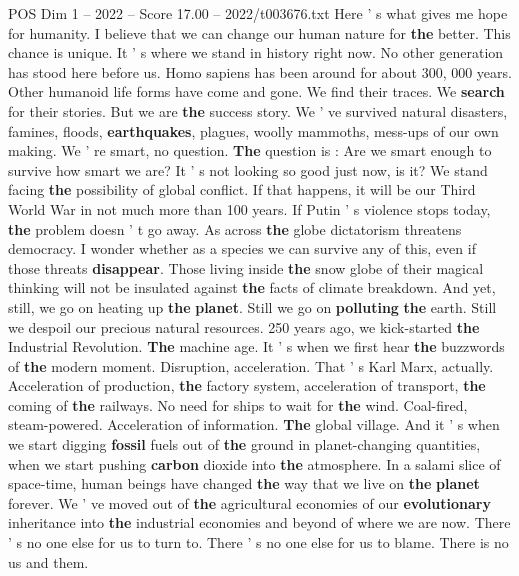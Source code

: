 \begin{textsample}{POS Dim 1 – 2022 – Score 17.00 – 2022/t003676.txt}  \label{ex:f1_pos_070}
Here ' s what gives me hope for humanity.
I believe that we can change our human nature for \textbf{the} better.
This chance is unique.
It ' s where we stand in history right now.
No other generation has stood here before us.
Homo sapiens has been around for about 300, 000 years.
Other humanoid life forms have come and gone.
We find their traces.
We \textbf{search} for their stories.
But we are \textbf{the} success story.
We ' ve survived natural disasters, famines, floods, \textbf{earthquakes}, plagues, woolly mammoths, mess-ups of our own making.
We ' re smart, no question. \textbf{The} question is : Are we smart enough to survive how smart we are?
It ' s not looking so good just now, is it?
We stand facing \textbf{the} possibility of global conflict.
If that happens, it will be our Third World War in not much more than 100 years.
If Putin ' s violence stops today, \textbf{the} problem doesn ' t go away.
As across \textbf{the} globe dictatorism threatens democracy.
I wonder whether as a species we can survive any of this, even if those threats \textbf{disappear}.
Those living inside \textbf{the} snow globe of their magical thinking will not be insulated against \textbf{the} facts of climate breakdown.
And yet, still, we go on heating up \textbf{the} \textbf{planet}.
Still we go on \textbf{polluting} \textbf{the} earth.
Still we despoil our precious natural resources. 250 years ago, we kick-started \textbf{the} Industrial Revolution. \textbf{The} machine age.
It ' s when we first hear \textbf{the} buzzwords of \textbf{the} modern moment.
Disruption, acceleration.
That ' s Karl Marx, actually.
Acceleration of production, \textbf{the} factory system, acceleration of transport, \textbf{the} coming of \textbf{the} railways.
No need for ships to wait for \textbf{the} wind.
Coal-fired, steam-powered.
Acceleration of information. \textbf{The} global village.
And it ' s when we start digging \textbf{fossil} fuels out of \textbf{the} ground in planet-changing quantities, when we start pushing \textbf{carbon} dioxide into \textbf{the} atmosphere.
In a salami slice of space-time, human beings have changed \textbf{the} way that we live on \textbf{the} \textbf{planet} forever.
We ' ve moved out of \textbf{the} agricultural economies of our \textbf{evolutionary} inheritance into \textbf{the} industrial economies and beyond of where we are now.
There ' s no one else for us to turn to.
There ' s no one else for us to blame.
There is no us and them.

\end{textsample}
